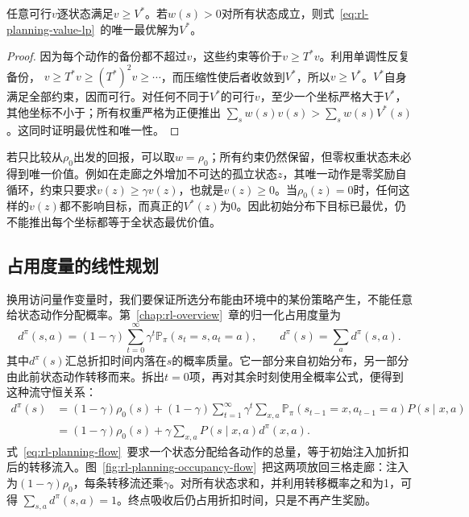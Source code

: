 \begin{theorem}[价值线性规划的解]
 \label{thm:rl-planning-value-lp}
 任意可行$v$逐状态满足$v\geq V^*$。若$w(s)>0$对所有状态成立，则式~\eqref{eq:rl-planning-value-lp}~的唯一最优解为$V^*$。
\end{theorem}
\begin{proof}
 因为每个动作的备份都不超过$v$，这些约束等价于$v\geq T^*v$。利用单调性反复备份，
 $v\geq T^*v\geq(T^*)^2v\geq\cdots$，而压缩性使后者收敛到$V^*$，所以$v\geq V^*$。$V^*$自身满足全部约束，因而可行。对任何不同于$V^*$的可行$v$，至少一个坐标严格大于$V^*$，其他坐标不小于；所有权重严格为正便推出
 $\sum_s w(s)v(s)>\sum_s w(s)V^*(s)$。这同时证明最优性和唯一性。
\end{proof}

若只比较从$\rho_0$出发的回报，可以取$w=\rho_0$；所有约束仍然保留，但零权重状态未必得到唯一价值。例如在走廊之外增加不可达的孤立状态$z$，其唯一动作是零奖励自循环，约束只要求$v(z)\geq\gamma v(z)$，也就是$v(z)\geq0$。当$\rho_0(z)=0$时，任何这样的$v(z)$都不影响目标，而真正的$V^*(z)$为0。因此初始分布下目标已最优，仍不能推出每个坐标都等于全状态最优价值。

\subsection{占用度量的线性规划}
\label{sec:rl-planning-occupancy-lp}

换用访问量作变量时，我们要保证所选分布能由环境中的某份策略产生，不能任意给状态动作分配概率。第~\ref{chap:rl-overview}~章的归一化占用度量为
\[
 d^\pi(s,a)=(1-\gamma)\sum_{t=0}^{\infty}
 \gamma^t\mathbb P_\pi(s_t=s,a_t=a),\qquad
 d^\pi(s)=\sum_a d^\pi(s,a).
\]
其中$d^\pi(s)$汇总折扣时间内落在$s$的概率质量。它一部分来自初始分布，另一部分由此前状态动作转移而来。拆出$t=0$项，再对其余时刻使用全概率公式，便得到这种流守恒关系：
\begin{equation}
 \begin{aligned}
 d^\pi(s)
 &=(1-\gamma)\rho_0(s)
   +(1-\gamma)\sum_{t=1}^{\infty}\gamma^t
     \sum_{x,a}\mathbb P_\pi(s_{t-1}=x,a_{t-1}=a)P(s\mid x,a)\\
 &=(1-\gamma)\rho_0(s)+\gamma\sum_{x,a}P(s\mid x,a)d^\pi(x,a).
 \end{aligned}
 \label{eq:rl-planning-flow}
\end{equation}
式~\eqref{eq:rl-planning-flow}~要求一个状态分配给各动作的总量，等于初始注入加折扣后的转移流入。图~\ref{fig:rl-planning-occupancy-flow}~把这两项放回三格走廊：注入为$(1-\gamma)\rho_0$，每条转移流还乘$\gamma$。对所有状态求和，并利用转移概率之和为1，可得
$\sum_{s,a}d^\pi(s,a)=1$。终点吸收后仍占用折扣时间，只是不再产生奖励。

